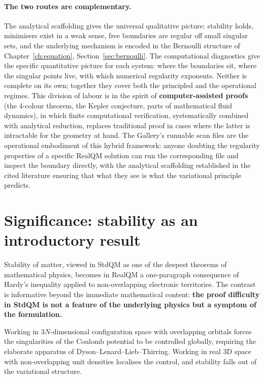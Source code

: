 \paragraph{The two routes are complementary.}
The analytical scaffolding gives the universal qualitative picture: stability holds, minimisers exist in a weak sense, free boundaries are regular off small singular sets, and the underlying mechanism is encoded in the Bernoulli structure of Chapter~\ref{ch:equation}, Section~\ref{sec:bernoulli}. The computational diagnostics give the specific quantitative picture for each system: where the boundaries sit, where the singular points live, with which numerical regularity exponents. Neither is complete on its own; together they cover both the principled and the operational regimes. This division of labour is in the spirit of \textbf{computer-assisted proofs} (the 4-colour theorem, the Kepler conjecture, parts of mathematical fluid dynamics), in which finite computational verification, systematically combined with analytical reduction, replaces traditional proof in cases where the latter is intractable for the geometry at hand. The Gallery's runnable scan files are the operational embodiment of this hybrid framework: anyone doubting the regularity properties of a specific RealQM solution can run the corresponding file and inspect the boundary directly, with the analytical scaffolding established in the cited literature ensuring that what they see is what the variational principle predicts.

\section{Significance: stability as an introductory result}\label{sec:som-significance}

Stability of matter, viewed in StdQM as one of the deepest theorems of mathematical physics, becomes in RealQM a one-paragraph consequence of Hardy's inequality applied to non-overlapping electronic territories. The contrast is informative beyond the immediate mathematical content: \textbf{the proof difficulty in StdQM is not a feature of the underlying physics but a symptom of the formulation.}

Working in $3N$-dimensional configuration space with overlapping orbitals forces the singularities of the Coulomb potential to be controlled globally, requiring the elaborate apparatus of Dyson--Lenard--Lieb--Thirring. Working in real 3D space with non-overlapping unit densities localises the control, and stability falls out of the variational structure.

